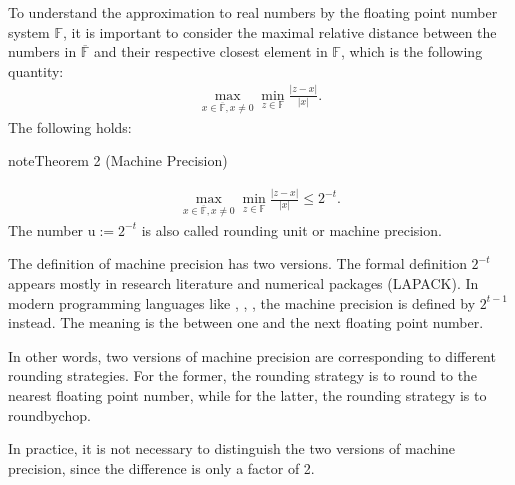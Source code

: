 \documentclass[letterpaper,10pt,english]{jupyterBook}
\begin{document}
\sphinxAtStartPar
To understand the approximation to real numbers by the floating point number system \(\mathbb{F}\), it is important to consider the maximal relative distance between the numbers in \(\overline{\mathbb{F}}\) and their respective closest element in \(\mathbb{F}\), which is the following quantity:
\begin{equation*}
\begin{split}\max_{x\in \overline{\mathbb{F}}, x\neq 0}\min_{z\in\mathbb{F}} \frac{|z - x|}{|x|}.\end{split}
\end{equation*}
\sphinxAtStartPar
The following holds:
\label{floating_point:THM-Ma-Pr}
\begin{sphinxadmonition}{note}{Theorem 2 (Machine Precision)}


\begin{equation*}
\begin{split}\max_{x\in \overline{\mathbb{F}}, x\neq 0}\min_{z\in\mathbb{F}} \frac{|z - x|}{|x|}\le  2^{-t}.\end{split}
\end{equation*}
\sphinxAtStartPar
The number \(\mathrm{u} := 2^{-t}\) is also called rounding unit or machine precision.
\end{sphinxadmonition}

\begin{sphinxShadowBox}
\sphinxstylesidebartitle{}

\sphinxAtStartPar
The definition of machine precision has two versions. The formal definition \(2^{-t}\) appears mostly in research literature and numerical packages (LAPACK). In modern programming languages like , , , the machine precision is defined by \(2^{t-1}\) instead. The meaning is the  between one and the next floating point number.

\sphinxAtStartPar
In other words, two versions of machine precision are corresponding to different rounding strategies. For the former, the rounding strategy is to round to the nearest floating point number, while for the latter, the rounding strategy is to round\sphinxhyphen{}by\sphinxhyphen{}chop.

\sphinxAtStartPar
In practice, it is not necessary to distinguish the two versions of machine precision, since the difference is only a factor of 2.
\end{sphinxShadowBox}
\end{document}
